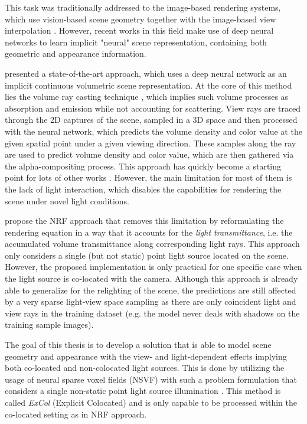 This task was traditionally addressed to the image-based rendering systems,
which use vision-based scene geometry together with the image-based view interpolation \cite{shumandkang2000}.
However, recent works in this field make use of deep neural networks
to learn implicit "neural" scene representation,
containing both geometric and appearance information. \cite{tewari2020state}

\cite{mildenhall2020nerf} presented a state-of-the-art approach,
which uses a deep neural network as an implicit continuous volumetric scene representation.
At the core of this method lies the volume ray casting technique \cite{drebin1988volume},
which implies such volume processes as absorption and emission
while not accounting for scattering.
View rays are traced through the 2D captures of the scene,
sampled in a 3D space and then processed with the neural network,
which predicts the volume density and color value at the given spatial point under a given viewing direction.
These samples along the ray are used to predict volume density and color value,
which are then gathered via the alpha-compositing process.
This approach has quickly become a starting point for lots of other works \cite{liu2021neural, garbin2021fastnerf, reiser2021kilonerf, yu2021plenoctrees, rebain2020derf, lindell2021autoint}.
However, the main limitation for most of them is the lack of light interaction,
which disables the capabilities for rendering the scene under novel light conditions.

\cite{bi2020neural} propose the NRF approach
that removes this limitation by reformulating the rendering equation in a way
that it accounts for the \textit{light transmittance},
i.e. the accumulated volume transmittance along corresponding light rays.
This approach only considers a single (but not static) point light source located on the scene.
However, the proposed implementation is only practical for one specific case
when the light source is co-located with the camera.
Although this approach is already able to generalize for the relighting of the scene,
the predictions are still affected by a very sparse light-view space sampling
as there are only coincident light and view rays in the training dataset
(e.g. the model never deals with shadows on the training sample images).


The goal of this thesis is to develop a solution
that is able to model scene geometry and appearance with the view- and light-dependent effects
implying both co-located and non-colocated light sources.
This is done by utilizing the usage of neural sparse voxel fields (NSVF) \cite{liu2021neural}
with such a problem formulation that considers a single non-static point light source illumination \cite{bi2020neural}.
This method is called \textit{ExCol} (Explicit Colocated) and is only capable
to be processed within the co-located setting as in NRF approach.


